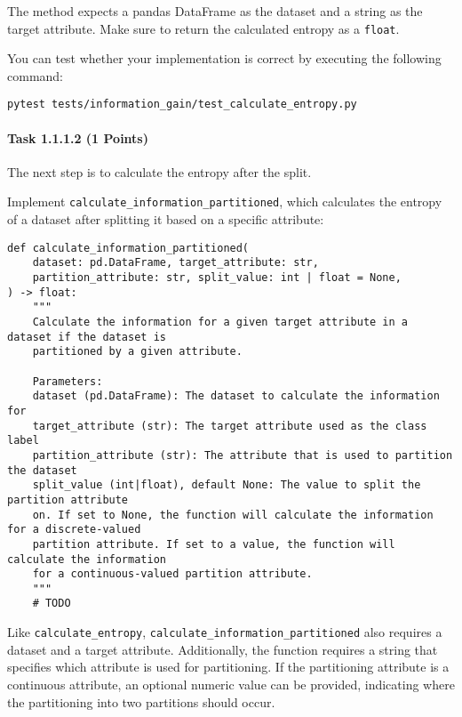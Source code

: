 \documentclass[
english,
smallborders
]{i6prcsht}
\newcommand{\points}[1]{\hfill \color{red}(#1 Points)\color{black}}
\begin{document}
\vspace*{0.1cm}

The method expects a pandas DataFrame as the dataset and a string as the target attribute. Make sure to return the calculated entropy as a \texttt{float}.

You can test whether your implementation is correct by executing the following command:

\vspace*{0.3cm}

\begin{lstlisting}
pytest tests/information_gain/test_calculate_entropy.py
\end{lstlisting}

\vspace*{0.1cm}

\paragraph*{Task 1.1.1.2 \points{1}} \hfill

The next step is to calculate the entropy after the split.

Implement \texttt{calculate\_information\_partitioned}, which calculates the entropy of a dataset after splitting it based on a specific attribute:

\vspace*{0.3cm}

\begin{lstlisting}
def calculate_information_partitioned(
	dataset: pd.DataFrame, target_attribute: str,
	partition_attribute: str, split_value: int | float = None,
) -> float:
	"""
	Calculate the information for a given target attribute in a dataset if the dataset is
	partitioned by a given attribute.

	Parameters:
	dataset (pd.DataFrame): The dataset to calculate the information for
	target_attribute (str): The target attribute used as the class label
	partition_attribute (str): The attribute that is used to partition the dataset
	split_value (int|float), default None: The value to split the partition attribute
	on. If set to None, the function will calculate the information for a discrete-valued
	partition attribute. If set to a value, the function will calculate the information
	for a continuous-valued partition attribute.
	"""
	# TODO
\end{lstlisting}

\vspace*{0.1cm}

Like \texttt{calculate\_entropy}, \texttt{calculate\_information\_partitioned} also requires a dataset and a target attribute. Additionally, the function requires a string that specifies which attribute is used for partitioning. If the partitioning attribute is a continuous attribute, an optional numeric value can be provided, indicating where the partitioning into two partitions should occur.
\end{document}
